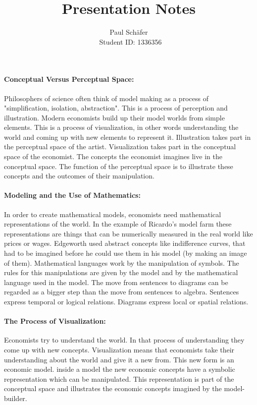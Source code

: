 \documentclass[12pt,a4paper]{article}
\author{Paul Sch\"afer \\\ Student ID: 1336356}
\begin{document}
\title{Presentation Notes}

\maketitle

\paragraph{Conceptual Versus Perceptual Space:}
Philosophers of science often think of model making as a process of "simplification, isolation, abstraction".
This is a process of perception and illustration.
Modern economists build up their model worlds from simple elements. This is a process of visualization, in other words understanding the world and coming up with new elements to represent it.
Illustration takes part in the perceptual space of the artist. Visualization takes part in the conceptual space of the economist.
The concepts the economist imagines live in the conceptual space.  The function of the perceptual space is to illustrate these concepts and the outcomes of their manipulation.

\paragraph{Modeling and the Use of Mathematics:}
In order to create mathematical models, economists need mathematical representations of the world. In the example of Ricardo's model farm these representations are things that can be numerically measured in the real world like prices or wages. Edgeworth used abstract concepts like indifference curves, that had to be imagined before he could use them in his model (by making an image of them). 
Mathematical languages work by the manipulation of symbols. The rules for this manipulations are given by the model and by the mathematical language used in the model. 
The move from sentences to diagrams can be regarded as a bigger step than the move from sentences to algebra. Sentences express temporal or logical relations. Diagrams express local or spatial relations.

\paragraph{The Process of Visualization:}
Economists try to understand the world. In that process of understanding they come up with new concepts. Visualization means that economists take their understanding about the world and give it a new from. This new form is an economic model. inside a model the new economic concepts have a symbolic representation which can be manipulated. This representation is part of the conceptual space and illustrates the economic concepts imagined by the model-builder.
\end{document}
